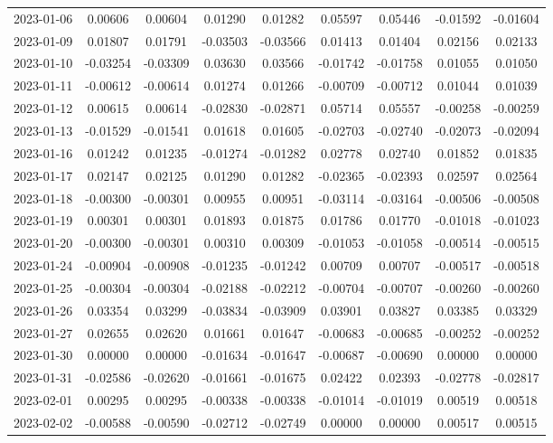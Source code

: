 \begin{footnotesize}
\begin{longtable}{lcccccccc}
2023-01-06 & 0.00606 & 0.00604 & 0.01290 & 0.01282 & 0.05597 & 0.05446 & -0.01592 & -0.01604 \\
2023-01-09 & 0.01807 & 0.01791 & -0.03503 & -0.03566 & 0.01413 & 0.01404 & 0.02156 & 0.02133 \\
2023-01-10 & -0.03254 & -0.03309 & 0.03630 & 0.03566 & -0.01742 & -0.01758 & 0.01055 & 0.01050 \\
2023-01-11 & -0.00612 & -0.00614 & 0.01274 & 0.01266 & -0.00709 & -0.00712 & 0.01044 & 0.01039 \\
2023-01-12 & 0.00615 & 0.00614 & -0.02830 & -0.02871 & 0.05714 & 0.05557 & -0.00258 & -0.00259 \\
2023-01-13 & -0.01529 & -0.01541 & 0.01618 & 0.01605 & -0.02703 & -0.02740 & -0.02073 & -0.02094 \\
2023-01-16 & 0.01242 & 0.01235 & -0.01274 & -0.01282 & 0.02778 & 0.02740 & 0.01852 & 0.01835 \\
2023-01-17 & 0.02147 & 0.02125 & 0.01290 & 0.01282 & -0.02365 & -0.02393 & 0.02597 & 0.02564 \\
2023-01-18 & -0.00300 & -0.00301 & 0.00955 & 0.00951 & -0.03114 & -0.03164 & -0.00506 & -0.00508 \\
2023-01-19 & 0.00301 & 0.00301 & 0.01893 & 0.01875 & 0.01786 & 0.01770 & -0.01018 & -0.01023 \\
2023-01-20 & -0.00300 & -0.00301 & 0.00310 & 0.00309 & -0.01053 & -0.01058 & -0.00514 & -0.00515 \\
2023-01-24 & -0.00904 & -0.00908 & -0.01235 & -0.01242 & 0.00709 & 0.00707 & -0.00517 & -0.00518 \\
2023-01-25 & -0.00304 & -0.00304 & -0.02188 & -0.02212 & -0.00704 & -0.00707 & -0.00260 & -0.00260 \\
2023-01-26 & 0.03354 & 0.03299 & -0.03834 & -0.03909 & 0.03901 & 0.03827 & 0.03385 & 0.03329 \\
2023-01-27 & 0.02655 & 0.02620 & 0.01661 & 0.01647 & -0.00683 & -0.00685 & -0.00252 & -0.00252 \\
2023-01-30 & 0.00000 & 0.00000 & -0.01634 & -0.01647 & -0.00687 & -0.00690 & 0.00000 & 0.00000 \\
2023-01-31 & -0.02586 & -0.02620 & -0.01661 & -0.01675 & 0.02422 & 0.02393 & -0.02778 & -0.02817 \\
2023-02-01 & 0.00295 & 0.00295 & -0.00338 & -0.00338 & -0.01014 & -0.01019 & 0.00519 & 0.00518 \\
2023-02-02 & -0.00588 & -0.00590 & -0.02712 & -0.02749 & 0.00000 & 0.00000 & 0.00517 & 0.00515 \\

\end{longtable}
\end{footnotesize}
